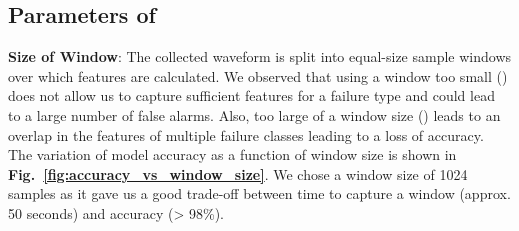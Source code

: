 %
%




\subsection{Parameters of \sol}
\label{subsec:prac} 
\ci \textbf{Size of Window}: The collected \aout waveform is split into equal-size sample windows over which features are calculated. We observed that using a window too small () does not allow us to capture sufficient features for a failure type and could lead to a large number of false alarms. Also, too large of a window size () leads to an overlap in the features of multiple failure classes leading to a loss of accuracy. The variation of model accuracy as a function of window size is shown in {\bfseries Fig.~\ref{fig:accuracy_vs_window_size}}. We chose a window size of 1024 samples 
as it gave us a good trade-off between time to capture a window (approx. 50 seconds) and accuracy (> 98\%).

